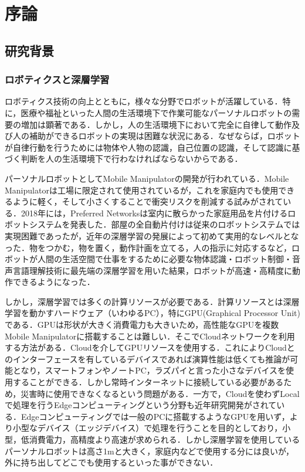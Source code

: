 \chapter{序論}
\label{chap_intro}
\newpage

\section{研究背景}
\subsection{ロボティクスと深層学習}
ロボティクス技術の向上とともに，様々な分野でロボットが活躍している．特に，医療や福祉といった人間の生活環境下で作業可能なパーソナルロボットの需要の増加は顕著である．しかし，人の生活環境下において完全に自律して動作及び人の補助ができるロボットの実現は困難な状況にある．なぜならば，ロボットが自律行動を行うためには物体や人物の認識，自己位置の認識，そして認識に基づく判断を人の生活環境下で行わなければならないからである．

パーソナルロボットとしてMobile Manipulatorの開発が行われている．Mobile Manipulatorは工場に限定されて使用されているが，これを家庭内でも使用できるように軽く，そして小さくすることで衝突リスクを削減する試みがされている．2018年には，Preferred Networksは室内に散らかった家庭用品を片付けるロボットシステムを発表した\cite{お片づけロボット}．部屋の全自動片付けは従来のロボットシステムでは実現困難であったが，近年の深層学習の発展によって初めて実用的なレベルとなった．物をつかむ，物を置く，動作計画を立てる，人の指示に対応するなど，ロボットが人間の生活空間で仕事をするために必要な物体認識・ロボット制御・音声言語理解技術に最先端の深層学習を用いた結果，ロボットが高速・高精度に動作できるようになった．

しかし，深層学習では多くの計算リソースが必要である．計算リソースとは深層学習を動かすハードウェア（いわゆるPC），特にGPU(Graphical Processor Unit)である．GPUは形状が大きく消費電力も大きいため，高性能なGPUを複数Mobile Manipulatorに搭載することは難しい．そこでCloudネットワークを利用する方法がある．Cloudを介してGPUリソースを使用する．これによりCloudとのインターフェースを有しているデバイスであれば演算性能は低くても推論が可能となり，スマートフォンやノートPC，ラズパイと言った小さなデバイスを使用することができる．しかし常時インターネットに接続している必要があるため，災害時に使用できなくなるという問題がある．一方で，Cloudを使わずLocalで処理を行うEdgeコンピューティングという分野も近年研究開発がされている．Edgeコンピューティングでは一般のPCに搭載するようなGPUを用いず，より小型なデバイス（エッジデバイス）で処理を行うことを目的としており，小型，低消費電力，高精度より高速が求められる．しかし深層学習を使用しているパーソナルロボットは高さ1mと大きく，家庭内などで使用する分には良いが，外に持ち出してどこでも使用するといった事ができない．


